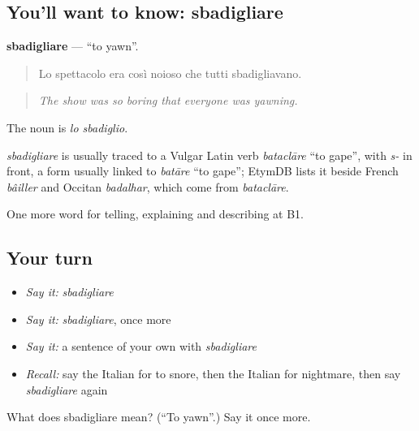 \subsection*{You'll want to know: sbadigliare}
\textbf{sbadigliare} — \textquotedblleft{}to yawn\textquotedblright{}.

\begin{quote}
Lo spettacolo era così noioso che tutti sbadigliavano.
\end{quote}

\begin{quote}
\emph{The show was so boring that everyone was yawning.}
\end{quote}

The noun is \emph{lo sbadiglio}.

\begin{cousinweb}
\emph{sbadigliare} is usually traced to a Vulgar Latin verb \emph{bataclāre} \textquotedblleft{}to gape\textquotedblright{}, with \emph{s-} in front, a form usually linked to \emph{batāre} \textquotedblleft{}to gape\textquotedblright{}; EtymDB lists it beside French \emph{bâiller} and Occitan \emph{badalhar}, which come from \emph{bataclāre}.
\end{cousinweb}

\begin{grammarlens}[title={What you've built}]
One more word for telling, explaining and describing at B1.
\end{grammarlens}

\subsection*{Your turn}
\begin{itemize}
\raggedright
  \item \emph{Say it:} \emph{sbadigliare}
  \item \emph{Say it:} \emph{sbadigliare}, once more
  \item \emph{Say it:} a sentence of your own with \emph{sbadigliare}
  \item \emph{Recall:} say the Italian for to snore, then the Italian for nightmare, then say \emph{sbadigliare} again
\end{itemize}

\begin{tcolorbox}[breakable,colback=teal!4,colframe=teal!35!black,title={Before you move on}]
What does sbadigliare mean? (\textquotedblleft{}To yawn\textquotedblright{}.) Say it once more.
\end{tcolorbox}

